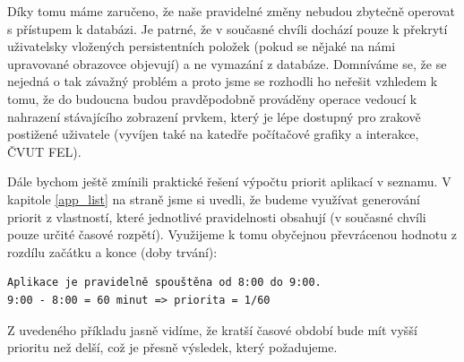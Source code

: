\documentclass[thesis=M,czech]{FITthesis}[2012/06/26]
\begin{document}
Díky tomu máme zaručeno, že naše pravidelné změny nebudou zbytečně operovat s přístupem k databázi. Je patrné, že v současné chvíli dochází pouze k překrytí uživatelsky vložených persistentních položek (pokud se nějaké na námi upravované obrazovce objevují) a ne vymazání z databáze. Domníváme se, že se nejedná o tak závažný problém a proto jsme se rozhodli ho neřešit vzhledem k tomu, že do budoucna budou pravděpodobně prováděny operace vedoucí k nahrazení stávajícího zobrazení prvkem, který je lépe dostupný pro zrakově postižené uživatele (vyvíjen také na katedře počítačové grafiky a interakce, ČVUT FEL).

Dále bychom ještě zmínili praktické řešení výpočtu priorit aplikací v seznamu. V kapitole \ref{app_list} na straně \pageref{app_list} jsme si uvedli, že budeme využívat generování priorit z vlastností, které jednotlivé pravidelnosti obsahují (v současné chvíli pouze určité časové rozpětí). Využijeme k tomu obyčejnou převrácenou hodnotu z rozdílu začátku a konce (doby trvání):

\begin{verbatim}
Aplikace je pravidelně spouštěna od 8:00 do 9:00.
9:00 - 8:00 = 60 minut => priorita = 1/60
\end{verbatim}

Z uvedeného příkladu jasně vidíme, že kratší časové období bude mít vyšší prioritu než delší, což je přesně výsledek, který požadujeme.
\end{document}
